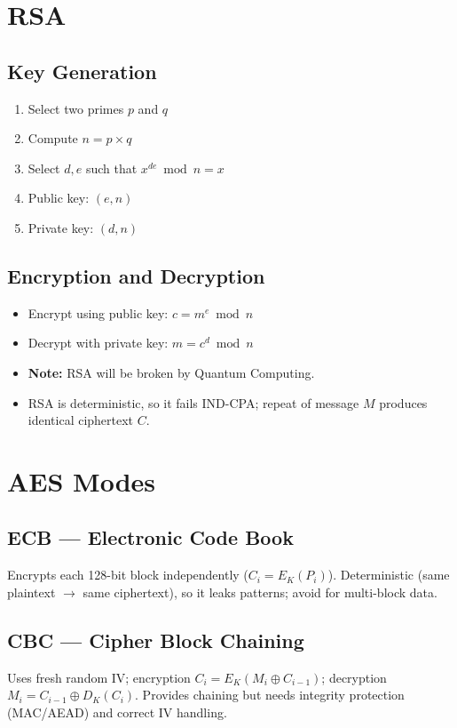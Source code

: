 \documentclass[11pt]{article}
\begin{document}
\section{RSA}
\subsection{Key Generation}
\begin{enumerate}
  \item Select two primes $p$ and $q$
  \item Compute $n = p \times q$
  \item Select $d,e$ such that $x^{de} \bmod n = x$
  \item Public key: $(e,n)$
  \item Private key: $(d,n)$
\end{enumerate}

\subsection{Encryption and Decryption}
\begin{itemize}
  \item Encrypt using public key: $c = m^e \bmod n$
  \item Decrypt with private key: $m = c^d \bmod n$
  \item \textbf{Note:} RSA will be broken by Quantum Computing.
  \item RSA is deterministic, so it fails IND-CPA; repeat of message $M$ produces identical ciphertext $C$.
\end{itemize}

\section{AES Modes}

\subsection{ECB --- Electronic Code Book}
Encrypts each 128-bit block independently ($C_i = E_K(P_i)$). Deterministic (same plaintext $\rightarrow$ same ciphertext), so it leaks patterns; avoid for multi-block data.

\subsection{CBC --- Cipher Block Chaining}
Uses fresh random IV; encryption $C_i = E_K(M_i \oplus C_{i-1})$; decryption $M_i = C_{i-1} \oplus D_K(C_i)$. Provides chaining but needs integrity protection (MAC/AEAD) and correct IV handling.
\end{document}
